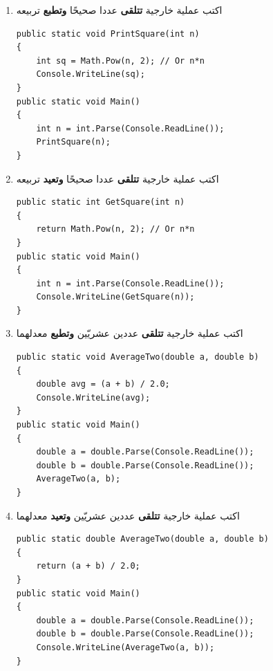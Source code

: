 ﻿\documentclass[14pt]{extarticle}
\begin{document}
\begin{enumerate}[itemsep=3em]
\begin{enumerate}
\item اكتب عملية خارجية \textbf{تتلقى} عددا صحيحًا \textbf{وتطبع} تربيعه
\ifwithsols
\begin{boxSolution}
\begin{english}
\begin{verbatim}
public static void PrintSquare(int n)
{
    int sq = Math.Pow(n, 2); // Or n*n
    Console.WriteLine(sq);
}
public static void Main()
{
    int n = int.Parse(Console.ReadLine());
    PrintSquare(n);
}
\end{verbatim}
\end{english}
\end{boxSolution}
\clearpage
\fi


\item اكتب عملية خارجية \textbf{تتلقى} عددا صحيحًا \textbf{وتعيد} تربيعه
\ifwithsols
\begin{boxSolution}
\begin{english}
\begin{verbatim}
public static int GetSquare(int n)
{
    return Math.Pow(n, 2); // Or n*n
}
public static void Main()
{
    int n = int.Parse(Console.ReadLine());
    Console.WriteLine(GetSquare(n));
}
\end{verbatim}
\end{english}
\end{boxSolution}
\fi

\item اكتب عملية خارجية \textbf{تتلقى} عددين عشريّين \textbf{وتطبع} معدلهما
\ifwithsols
\begin{boxSolution}
\begin{english}
\begin{verbatim}
public static void AverageTwo(double a, double b)
{
    double avg = (a + b) / 2.0;
    Console.WriteLine(avg);
}
public static void Main()
{
    double a = double.Parse(Console.ReadLine());
    double b = double.Parse(Console.ReadLine());
    AverageTwo(a, b);
}
\end{verbatim}
\end{english}
\end{boxSolution}
\clearpage
\fi

\item اكتب عملية خارجية \textbf{تتلقى} عددين عشريّين \textbf{وتعيد} معدلهما
\ifwithsols
\begin{boxSolution}
\begin{english}
\begin{verbatim}
public static double AverageTwo(double a, double b)
{
    return (a + b) / 2.0;
}
public static void Main()
{
    double a = double.Parse(Console.ReadLine());
    double b = double.Parse(Console.ReadLine());
    Console.WriteLine(AverageTwo(a, b));
}
\end{verbatim}
\end{english}
\end{boxSolution}
\clearpage
\fi


\end{enumerate}
\end{enumerate}
\end{document}

